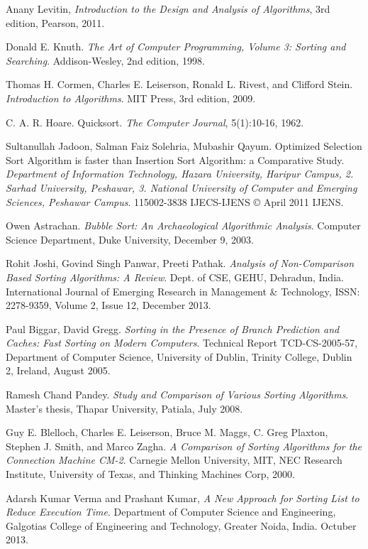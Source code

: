\documentclass[tcc2]{uftex}
\begin{document}
\begin{thebibliography}{99}


Anany Levitin,
\textit{Introduction to the Design and Analysis of Algorithms},
3rd edition, Pearson, 2011.

    Donald E. Knuth.
    \textit{The Art of Computer Programming, Volume 3: Sorting and Searching}.
    Addison-Wesley, 2nd edition, 1998.

    Thomas H. Cormen, Charles E. Leiserson, Ronald L. Rivest, and Clifford Stein.
    \textit{Introduction to Algorithms}.
    MIT Press, 3rd edition, 2009.

    C. A. R. Hoare.
    Quicksort.
    \textit{The Computer Journal}, 5(1):10-16, 1962.

    
  Sultanullah Jadoon, Salman Faiz Solehria, Mubashir Qayum.
  Optimized Selection Sort Algorithm is faster than Insertion Sort Algorithm: a Comparative Study.
  \textit{Department of Information Technology, Hazara University, Haripur Campus, 2. Sarhad University, Peshawar, 3. National University of 
  Computer and Emerging Sciences, Peshawar Campus}.
  115002-3838 IJECS-IJENS © April 2011 IJENS.

    Owen Astrachan.
    \textit{Bubble Sort: An Archaeological Algorithmic Analysis}.
    Computer Science Department, Duke University, December 9, 2003.

Rohit Joshi, Govind Singh Panwar, Preeti Pathak.
\textit{Analysis of Non-Comparison Based Sorting Algorithms: A Review}.
Dept. of CSE, GEHU, Dehradun, India.
International Journal of Emerging Research in Management \& Technology, ISSN: 2278-9359, Volume 2, Issue 12, December 2013.

Paul Biggar, David Gregg.
\textit{Sorting in the Presence of Branch Prediction and Caches: Fast Sorting on Modern Computers}.
Technical Report TCD-CS-2005-57, Department of Computer Science, University of Dublin, Trinity College, Dublin 2, Ireland, August 2005.

Ramesh Chand Pandey.
\textit{Study and Comparison of Various Sorting Algorithms}.
Master's thesis, Thapar University, Patiala, July 2008.

Guy E. Blelloch, Charles E. Leiserson, Bruce M. Maggs, C. Greg Plaxton, Stephen J. Smith, and Marco Zagha.
\textit{A Comparison of Sorting Algorithms for the Connection Machine CM-2}.
Carnegie Mellon University, MIT, NEC Research Institute, University of Texas, and Thinking Machines Corp, 2000.

Adarsh Kumar Verma and Prashant Kumar,
\textit{A New Approach for Sorting List to Reduce Execution Time}.
Department of Computer Science and Engineering, Galgotias College of Engineering and Technology, Greater Noida, India. Octuber 2013.



\end{thebibliography}


\onehalfspacing
\end{document}
